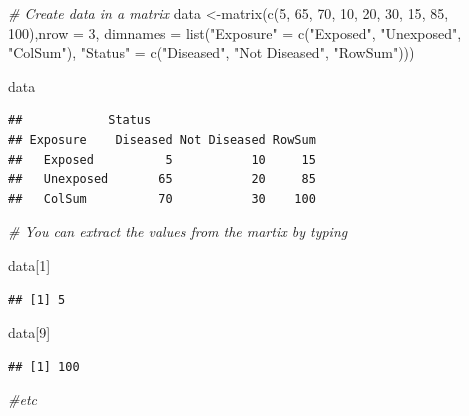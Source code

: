 \documentclass[
]{book}
\newenvironment{Shaded}{\begin{snugshade}}{\end{snugshade}}
\newcommand{\AttributeTok}[1]{\textcolor[rgb]{0.77,0.63,0.00}{#1}}
\newcommand{\CommentTok}[1]{\textcolor[rgb]{0.56,0.35,0.01}{\textit{#1}}}
\newcommand{\DecValTok}[1]{\textcolor[rgb]{0.00,0.00,0.81}{#1}}
\newcommand{\FunctionTok}[1]{\textcolor[rgb]{0.00,0.00,0.00}{#1}}
\newcommand{\NormalTok}[1]{#1}
\newcommand{\OtherTok}[1]{\textcolor[rgb]{0.56,0.35,0.01}{#1}}
\newcommand{\StringTok}[1]{\textcolor[rgb]{0.31,0.60,0.02}{#1}}
\begin{document}
\begin{Shaded}
\begin{Highlighting}[]
\CommentTok{\# Create data in a matrix}
\NormalTok{data }\OtherTok{\textless{}{-}}\FunctionTok{matrix}\NormalTok{(}\FunctionTok{c}\NormalTok{(}\DecValTok{5}\NormalTok{, }\DecValTok{65}\NormalTok{, }\DecValTok{70}\NormalTok{, }\DecValTok{10}\NormalTok{, }\DecValTok{20}\NormalTok{, }\DecValTok{30}\NormalTok{, }\DecValTok{15}\NormalTok{, }\DecValTok{85}\NormalTok{, }\DecValTok{100}\NormalTok{),}\AttributeTok{nrow =} \DecValTok{3}\NormalTok{, }\AttributeTok{dimnames =} \FunctionTok{list}\NormalTok{(}\StringTok{"Exposure"} \OtherTok{=} \FunctionTok{c}\NormalTok{(}\StringTok{"Exposed"}\NormalTok{, }\StringTok{"Unexposed"}\NormalTok{, }\StringTok{"ColSum"}\NormalTok{), }\StringTok{"Status"} \OtherTok{=} \FunctionTok{c}\NormalTok{(}\StringTok{"Diseased"}\NormalTok{, }\StringTok{"Not Diseased"}\NormalTok{, }\StringTok{"RowSum"}\NormalTok{)))}

\NormalTok{data}
\end{Highlighting}
\end{Shaded}

\begin{verbatim}
##            Status
## Exposure    Diseased Not Diseased RowSum
##   Exposed          5           10     15
##   Unexposed       65           20     85
##   ColSum          70           30    100
\end{verbatim}

\begin{Shaded}
\begin{Highlighting}[]
\CommentTok{\# You can extract the values from the martix by typing}

\NormalTok{data[}\DecValTok{1}\NormalTok{]}
\end{Highlighting}
\end{Shaded}

\begin{verbatim}
## [1] 5
\end{verbatim}

\begin{Shaded}
\begin{Highlighting}[]
\NormalTok{data[}\DecValTok{9}\NormalTok{]}
\end{Highlighting}
\end{Shaded}

\begin{verbatim}
## [1] 100
\end{verbatim}

\begin{Shaded}
\begin{Highlighting}[]
\CommentTok{\#etc}
\end{Highlighting}
\end{Shaded}
\end{document}
